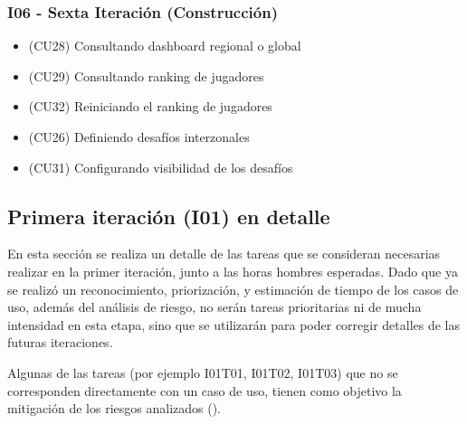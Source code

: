 \subsubsection{I06 - Sexta Iteración (Construcción)}
\begin{itemize}
\item (CU28) Consultando dashboard regional o global
\item (CU29) Consultando ranking de jugadores
\item (CU32) Reiniciando el ranking de jugadores
\item (CU26) Definiendo desafíos interzonales
\item (CU31) Configurando visibilidad de los desafíos
\end{itemize}


\subsection{Primera iteración (I01) en detalle}
\label{subsec:primeraiteracion}
En esta sección se realiza un detalle de las tareas que se consideran necesarias realizar en la primer iteración, junto a las horas hombres esperadas. Dado que ya se realizó un reconocimiento, priorización, y estimación de tiempo de los casos de uso, además del análisis de riesgo, no serán tareas prioritarias ni de mucha intensidad en esta etapa, sino que se utilizarán para poder corregir detalles de las futuras iteraciones.

Algunas de las tareas (por ejemplo I01T01, I01T02, I01T03) que no se corresponden directamente con un caso de uso, tienen como objetivo la mitigación de los riesgos analizados ().

